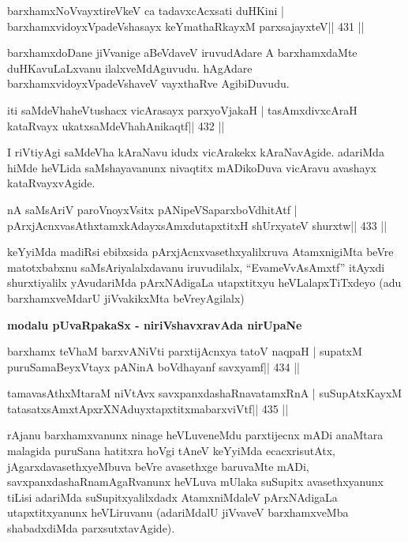 \begin{shl}
barxhamxNoV\s vayxtireVkeV ca tadavxcAcxsati duHKini |
barxhamxvidoyxVpadeVshasayx keYmathaRkayxM parxsajayxteV\hfill || 431 ||
\end{shl}

\begin{artha}
barxhamxdoDane jiVvanige aBeVdaveV iruvudAdare A barxhamxdaMte duHKavuLaLxvanu ilalxveMdAguvudu. hAgAdare barxhamxvidoyxVpadeVshaveV vayxthaRve AgibiDuvudu.
\end{artha}

\begin{shl}
iti saMdeVhaheVtushacx vicArasayx parxyoVjakaH |
tasAmxdivxcAraH kataRvayx ukatxsaMdeVhahAnikaqtf\hfill || 432 ||
\end{shl}

\begin{artha}
I riVtiyAgi saMdeVha kAraNavu idudx vicArakekx kAraNavAgide. adariMda hiMde heVLida saMshayavanunx nivaqtitx mADikoDuva vicAravu avashayx kataRvayxvAgide.
\end{artha}

\begin{shl}
nA saMsAriV paroV\s noyxV\s sitx pANipeVSaparxboVdhitAtf |
pArxjAcnxvasAthxtamxkAdayxsAmxdutapxtitxH shUrxyateV shurxtw\hfill || 433 ||
\end{shl}

\begin{artha}
keYyiMda madiRsi ebibxsida pArxjAcnxvasethxyalilxruva AtamxnigiMta
beVre matotxbabxnu saMsAriyalalxdavanu iruvudilalx, ``EvameVvAsAmxtf''
itAyxdi shurxtiyalilx yAvudariMda pArxNAdigaLa utapxtitxyu
heVLalapxTiTxdeyo (adu barxhamxveMdarU jiVvakikxMta beVreyAgilalx)
\end{artha}

\medskip
\centerline{\Large{\textbf{modalu pUvaRpakaSx - niriVshavxravAda nirUpaNe}}}

\medskip

\begin{shl}
barxhamx teV\s haM barxvANiVti parxtijAcnxya tatoV naqpaH |
supatxM puruSamaBeyxVtayx pANinA boVdhayanf savxyamf\hfill || 434 ||
\end{shl}

\begin{shl}
tamavasAthxMtaraM niVtAvx savxpanxdashaRnavatamxRnA |
suSupAtxKayxM tatasatxsAmxtApxrXNAduyxtapxtitxmabarxviVtf\hfill || 435 ||
\end{shl}

\begin{artha}
rAjanu barxhamxvanunx ninage heVLuveneMdu parxtijecnx mADi anaMtara
malagida puruSana hatitxra hoVgi tAneV keYyiMda ecacxrisutAtx,
jAgarxdavasethxyeMbuva beVre avasethxge baruvaMte mADi,
savxpanxdashaRnamAgaRvanunx heVLuva mUlaka suSupitx avasethxyanunx
tiLisi adariMda suSupitxyalilxdadx AtamxniMdaleV pArxNAdigaLa
utapxtitxyanunx heVLiruvanu (adariMdalU jiVvaveV barxhamxveMba
shabadxdiMda parxsutxtavAgide).
\end{artha}

